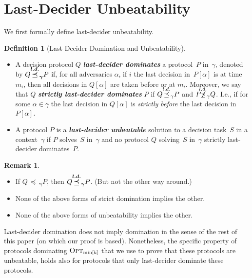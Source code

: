 \documentclass[11pt]{article}
\theoremstyle{definition}
\newtheorem{definition}{Definition}
\newtheorem{remark}{Remark}
\newcommand{\OptMink}{\mbox{$\mbox{\sc Opt}_{\min[k]}$}}
\newcommand{\defemph}[1]{\textbf{\textit{#1}}}
\newcommand{\dom}{\,{\preceq}\,}
\begin{document}
\section{Last-Decider Unbeatability}
\label{sec-last-decider}

We first formally define last-decider unbeatability.

\begin{definition}[Last-Decider Domination and Unbeatability]
\leavevmode
\begin{itemize}
\item
A decision protocol $Q$ \defemph{last-decider dominates} a protocol~$P$ in~$\gamma$, denoted by $Q\boldsymbol{\overset{\smash{l.d.}}{\dom}_\gamma} P$ if, for all adversaries $\alpha$, if $i$ the last decision in~$P[\alpha]$ is at time $m_i$, then all decisions in $Q[\alpha]$ are taken before or at $m_i$. Moreover, we say that $Q$  \defemph{strictly last-decider dominates} $P$
if $Q\overset{\smash{l.d.}}{\dom}_\gamma P$ and  $P\!\!\boldsymbol{\not}\!\!\!\overset{\smash{l.d.}}{\dom}_\gamma Q$. I.e., if for some $\alpha\in\gamma$ the last decision in $Q[\alpha]$ is {\em strictly before} the last decision in $P[\alpha]$.
\item
A protocol $P$ is a \defemph{last-decider unbeatable} solution to a decision task~$S$ in a context~$\gamma$ if $P$ solves~$S$ in~$\gamma$ and no protocol $Q$ solving~$S$ in~$\gamma$ strictly last-decider dominates~$P$.
\end{itemize}
\end{definition}

\begin{remark}
\leavevmode
\begin{itemize}
\item
If $Q\boldsymbol{\dom_\gamma} P$, then $Q\boldsymbol{\overset{\smash{l.d.}}{\dom}_\gamma} P$. (But not the other way around.)
\item
None of the above forms of strict domination implies the other.
\item
None of the above forms of unbeatability implies the other.
\end{itemize}
\end{remark}

Last-decider domination does not imply domination in the sense of the rest of this paper (on which our proof is based).
Nonetheless, the specific property of protocols dominating $\OptMink$ that we use to prove that these protocols are unbeatable, holds also for protocols that only last-decider dominate these protocols.
\end{document}
